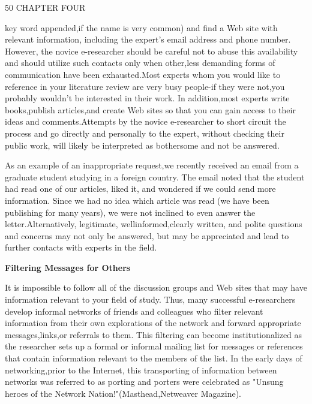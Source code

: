 \documentclass{article}
\begin{document}
\hspace{-2cm}
50
\hspace{1cm}
CHAPTER FOUR
\vspace{5mm}

key word appended,if the name is very common) and find a Web site with relevant information, including the expert's email address and phone number. However, the novice e-researcher should be careful not to abuse this availability and should utilize such contacts only when other,less demanding forms of communication have been exhausted.Most experts whom you would like to reference in your literature review are very busy people-if they were not,you probably wouldn't be interested in their work. In addition,most experts write books,publish articles,and create Web sites so that you can gain access to their ideas and comments.Attempts by the novice e-researcher to short circuit the process and go directly and personally to the expert, without checking their public work, will likely be interpreted as bothersome and not be answered.

As an example of an inappropriate request,we recently received an email from a graduate student studying in a foreign country. The email noted that the student had read one of our articles, liked it, and wondered if we could send more information.
Since we had no idea which article was read (we have been publishing for many years), we were not inclined to even answer the letter.Alternatively, legitimate, wellinformed,clearly written, and polite questions and concerns may not only be answered,
but may be appreciated and lead to further contacts with experts in the field.

\vspace{5mm}
\hspace{-2cm}
\textbf{Filtering Messages for Others}
\vspace{5mm}

It is impossible to follow all of the discussion groups and Web sites that may have information relevant to your field of study. Thus, many successful e-researchers develop informal networks of friends and colleagues who filter relevant information
from their own explorations of the network and forward appropriate messages,links,or referrals to them. This filtering can become institutionalized as the researcher sets up a formal or informal mailing list for messages or references that contain information relevant to the members of the list. In the early days of networking,prior to the
Internet, this transporting of information between networks was referred to as porting and porters were celebrated as "Unsung heroes of the Network Nation!"(Masthead,Netweaver Magazine).
\end{document}
